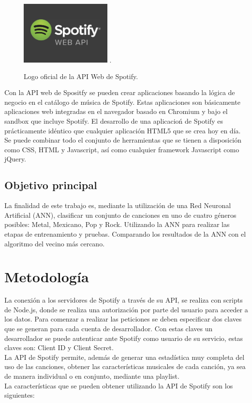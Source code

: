 \documentclass[conference]{IEEEtran}
\begin{document}
\begin{figure}[ht]
    \centering
    \includegraphics[width=1.8in]{./images/APIWebSpotify.jpg}
    \DeclareGraphicsExtensions.
    \caption{ Logo oficial de la API Web de Spotify. }
\end{figure}

Con la API web de Spositfy se pueden crear aplicaciones basando la lógica de negocio en el catálogo de música de Spotify. Estas aplicaciones son básicamente aplicaciones web integradas en el navegador basado en Chromium y bajo el sandbox que incluye Spotify. El desarrollo de una aplicacioń de Spotify es prácticamente idéntico que cualquier aplicación HTML5 que se crea hoy en día. Se puede combinar todo el conjunto de herramientas que se tienen a disposición como CSS, HTML y Javascript, así como cualquier framework Javascript como jQuery.

\subsection{Objetivo principal}
La finalidad de este trabajo es, mediante la utilización de una Red Neuronal Artificial (ANN), clasificar un conjunto de canciones en uno de cuatro géneros posibles: Metal, Mexicano, Pop y Rock. Utilizando la ANN para realizar las etapas de entrenamiento y pruebas. Comparando los resultados de la ANN con el algoritmo del vecino más cercano.\\

\section{Metodolog\'ia}
La conexión a los servidores de Spotify a través de su API, se realiza con scripts de Node.js, donde se realiza una autorización por parte del usuario para acceder a los datos. Para comenzar a realizar las peticiones se deben especificar dos claves que se generan para cada cuenta de desarrollador. Con estas claves un desarrollador se puede autenticar ante Spotify como usuario de su servicio, estas claves son: Client ID y Client Secret.\\

La API de Spotify permite, además de generar una estadística muy completa del uso de las canciones, obtener las características musicales de cada canción, ya sea de manera individual o en conjunto, mediante una playlist.\\
La características que se pueden obtener utilizando la API de Spotify son los siguientes: \\
\end{document}
